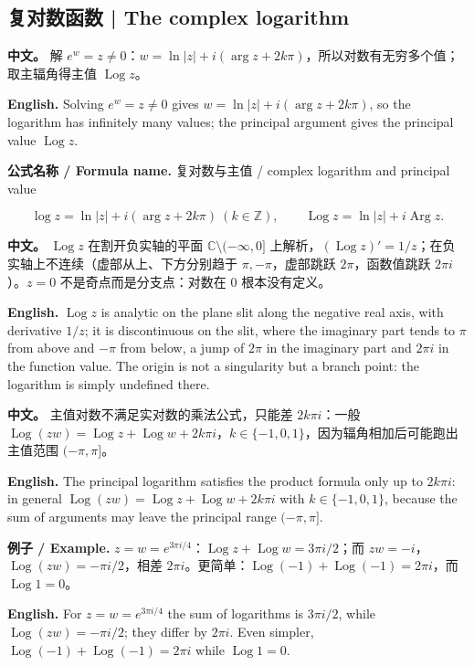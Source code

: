 \documentclass[UTF8,11pt,a4paper]{ctexart}
\newcommand{\EN}[1]{\par\noindent \textbf{English.} #1\par}
\newcommand{\FORMULA}[2]{\par\noindent\textbf{公式名称 / Formula name.} #1 / #2\par}
\newcommand{\EX}[2]{\par\noindent \textbf{例子 / Example.} #1\par\EN{#2}}
\newcommand{\APS}[2]{\par\noindent\textbf{中文。} #1\par\noindent\textbf{English.} #2\par\smallskip}
\begin{document}
\subsection{复对数函数 | The complex logarithm}
\APS{解 $e^w=z\ne0$：$w=\ln|z|+i(\arg z+2k\pi)$，所以对数有无穷多个值；取主辐角得主值 $\operatorname{Log}z$。}{Solving $e^w=z\ne0$ gives $w=\ln|z|+i(\arg z+2k\pi)$, so the logarithm has infinitely many values; the principal argument gives the principal value $\operatorname{Log}z$.}
\FORMULA{复对数与主值}{complex logarithm and principal value}
\[
\log z=\ln|z|+i(\arg z+2k\pi)\ (k\in\mathbb Z),\qquad
\operatorname{Log}z=\ln|z|+i\operatorname{Arg}z.
\]
\APS{$\operatorname{Log}z$ 在割开负实轴的平面 $\mathbb C\setminus(-\infty,0]$ 上解析，$(\operatorname{Log}z)'=1/z$；在负实轴上不连续（虚部从上、下方分别趋于 $\pi,-\pi$，虚部跳跃 $2\pi$，函数值跳跃 $2\pi i$）。$z=0$ 不是奇点而是分支点：对数在 $0$ 根本没有定义。}{$\operatorname{Log}z$ is analytic on the plane slit along the negative real axis, with derivative $1/z$; it is discontinuous on the slit, where the imaginary part tends to $\pi$ from above and $-\pi$ from below, a jump of $2\pi$ in the imaginary part and $2\pi i$ in the function value. The origin is not a singularity but a branch point: the logarithm is simply undefined there.}
\APS{主值对数不满足实对数的乘法公式，只能差 $2k\pi i$：一般 $\operatorname{Log}(zw)=\operatorname{Log}z+\operatorname{Log}w+2k\pi i$，$k\in\{-1,0,1\}$，因为辐角相加后可能跑出主值范围 $(-\pi,\pi]$。}{The principal logarithm satisfies the product formula only up to $2k\pi i$: in general $\operatorname{Log}(zw)=\operatorname{Log}z+\operatorname{Log}w+2k\pi i$ with $k\in\{-1,0,1\}$, because the sum of arguments may leave the principal range $(-\pi,\pi]$.}
\EX{$z=w=e^{3\pi i/4}$：$\operatorname{Log}z+\operatorname{Log}w=3\pi i/2$；而 $zw=-i$，$\operatorname{Log}(zw)=-\pi i/2$，相差 $2\pi i$。更简单：$\operatorname{Log}(-1)+\operatorname{Log}(-1)=2\pi i$，而 $\operatorname{Log}1=0$。}{For $z=w=e^{3\pi i/4}$ the sum of logarithms is $3\pi i/2$, while $\operatorname{Log}(zw)=-\pi i/2$; they differ by $2\pi i$. Even simpler, $\operatorname{Log}(-1)+\operatorname{Log}(-1)=2\pi i$ while $\operatorname{Log}1=0$.}
\end{document}
